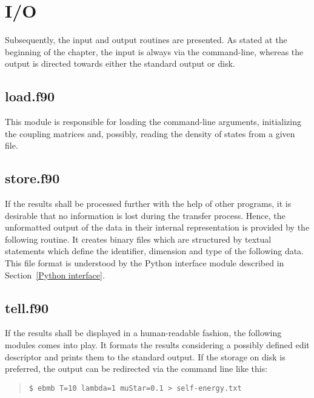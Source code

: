 

\section{I/O}

Subsequently, the input and output routines are presented. As stated at the
beginning of the chapter, the input is always via the command-line, whereas the
output is directed towards either the standard output or disk.

\subsection{load.f90}

This module is responsible for loading the command-line arguments, initializing
the coupling matrices and, possibly, reading the density of states from a given
file.



\subsection{store.f90}

If the results shall be processed further with the help of other programs, it is
desirable that no information is lost during the transfer process. Hence, the
unformatted output of the data in their internal representation is provided by
the following routine. It creates binary files which are structured by textual
statements which define the identifier, dimension and type of the following
data. This file format is understood by the Python interface module described in
Section~\ref{Python interface}.



\subsection{tell.f90}

If the results shall be displayed in a human-readable fashion, the following
modules comes into play. It formats the results considering a possibly defined
edit descriptor and prints them to the standard output. If the storage on disk
is preferred, the output can be redirected via the command line like this:
%
\begin{quote}
    \verb|$ ebmb T=10 lambda=1 muStar=0.1 > self-energy.txt|
\end{quote}

